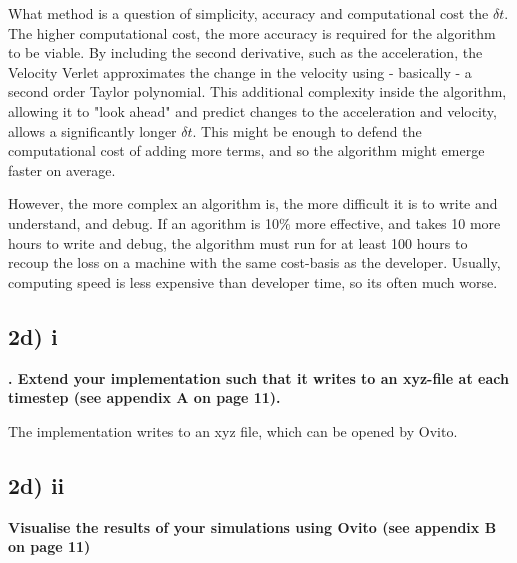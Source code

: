 What method is a question of simplicity, accuracy and computational cost the $\delta t$.  The higher computational cost, the more accuracy is required for the algorithm to be viable. By including the second derivative, such as the acceleration, the Velocity Verlet approximates the change in the velocity using - basically - a second order Taylor polynomial. This additional complexity inside the algorithm, allowing it to "look ahead" and predict changes to the acceleration and velocity, allows a significantly longer $\delta t$. This might be enough to defend the computational cost of adding more terms, and so the algorithm might emerge faster on average.

However, the more complex an algorithm is, the more difficult it is to write and understand, and debug. If an agorithm is 10\% more effective, and takes 10 more hours to write and debug, the algorithm must run for at least 100 hours to recoup the loss on a machine with the same cost-basis as the developer. Usually, computing speed is less expensive than developer time, so its often much worse.

\subsection*{2d) i}
\textbf{. Extend your implementation such that it writes to an xyz-file at each timestep (see appendix A on page 11).}

The implementation writes to an xyz file, which can be opened by Ovito.

\subsection*{2d) ii}
\textbf{Visualise the results of your simulations using Ovito (see appendix B on page 11)}


